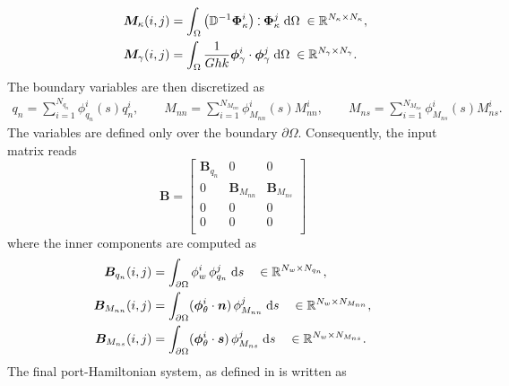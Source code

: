 \documentclass[preprint,12pt]{elsarticle}
\def\onedot{$\mathsurround0pt\ldotp$}
\def\cddot{%
	\mathbin{\vcenter{\baselineskip.67ex
			\hbox{\onedot}\hbox{\onedot}}%
}}
\begin{document}
{\begin{equation}
\begin{gathered}
\begin{aligned}
	\end{aligned} \qquad
	\begin{aligned}
	&\bm{M}_\kappa(i,j) = \int_{\Omega}  \left( \mathbb{D}^{-1} \bm{\Phi}_\kappa^i \right) \cddot \bm{\Phi}_\kappa^j \d\Omega \; \in \mathbb{R}^{N_\kappa \times N_\kappa},\\
	&\bm{M}_{\gamma}(i,j) = \int_{\Omega} \frac{1}{G h k} \bm{\phi}_{\gamma}^i \cdot \bm{\phi}_{\gamma}^j \d\Omega \; \in \mathbb{R}^{N_{\gamma} \times N_{\gamma}}. \\
	\end{aligned}
	\end{gathered}
\end{equation}
The boundary variables are then discretized as
\begin{equation}
	\begin{aligned}
	q_n = \sum_{i = 1}^{N_{q_n}} \phi_{q_n}^i(s) q_n^i, \qquad
	M_{nn} = \sum_{i = 1}^{N_{M_{nn}}} \phi_{M_{nn}}^i(s) M_{nn}^i, \qquad
	M_{ns} = \sum_{i = 1}^{N_{M_{ns}}} \phi_{M_{ns}}^i(s) M_{ns}^i.
	\end{aligned}
\end{equation}
The variables are defined only over the boundary $\partial\Omega$. Consequently, the input matrix reads
\begin{equation}
\bm{B} = \begin{bmatrix}
\bm{B}_{q_n} & 0 & 0 \\
0 & \bm{B}_{M_{nn}} & \bm{B}_{M_{ns}} \\
0 & 0 & 0 \\
0 & 0 & 0 \\
\end{bmatrix} 
\end{equation}
where the inner components are computed as
\begin{equation}
\begin{aligned}
\bm{B}_{q_n}(i,j) &= \int_{\partial\Omega} {\phi}_{w}^i \, {\phi}_{q_n}^j \d{s} \quad \in \mathbb{R}^{N_w \times N_{q_n}} , \\
\bm{B}_{M_{nn}}(i,j) &= \int_{\partial\Omega} (\bm{\phi}_{\theta}^i \cdot \bm{n})\, \phi_{M_{nn}}^j \d{s} \quad \in \mathbb{R}^{N_w \times N_{M_{nn}}} , \\
\bm{B}_{M_{ns}}(i,j) &= \int_{\partial\Omega} (\bm{\phi}_{\theta}^i \cdot \bm{s})\, \phi_{M_{ns}}^j \d{s} \quad \in \mathbb{R}^{N_w \times N_{M_{ns}}}. \\
\end{aligned}
\end{equation}
The final port-Hamiltonian system, as defined in \cite{beattie2018linear} is written as
}
\end{document}
